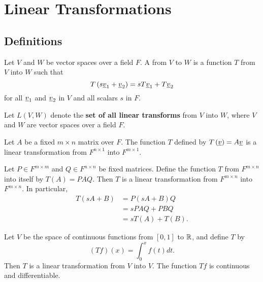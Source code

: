 \section{Linear Transformations}

\subsection{Definitions}

\begin{definition}
Let $V$ and $W$ be vector spaces over a field $F$.
A  from $V$ to $W$ is a function $T$ from $V$ into $W$ such that
\begin{equation*}
T \left( s \underline{v}_1 + \underline{v}_2 \right)
= s T \underline{v}_1 + T \underline{v}_2
\end{equation*}
for all $\underline{v}_1$ and $\underline{v}_2$ in $V$ and all scalars $s$ in $F$.
\end{definition}

\begin{definition}
Let $L(V,W)$ denote the \textbf{set of all linear transforms} from $V$ into $W$, where $V$ and $W$ are vector spaces over a field $F$.
\end{definition}

\begin{example}
Let $A$ be a fixed $m \times n$ matrix over $F$.
The function $T$ defined by $T \left( \underline{v} \right) = A \underline{v}$ is a linear transformation from $F^{n \times 1}$ into $F^{m \times 1}$.
\end{example}

\begin{example}
Let $P \in F^{m \times m}$ and $Q \in F^{n \times n}$ be fixed matrices.
Define the function $T$ from $F^{m \times n}$ into itself by $T(A) = P A Q$.
Then $T$ is a linear transformation from $F^{m \times n}$ into $F^{m \times n}$.
In particular,
\begin{equation*}
\begin{split}
T \left( s A + B \right)
&= P \left( s A + B \right) Q \\
&= s P A Q + P B Q \\
&= s T \left( A \right) + T \left( B \right) .
\end{split}
\end{equation*}
\end{example}

\begin{example}
Let $V$ be the space of continuous functions from $[0,1]$ to $\mathbb{R}$, and define $T$ by
\begin{equation*}
(Tf)(x) = \int_{0}^x f(t) dt .
\end{equation*}
Then $T$ is a linear transformation from $V$ into $V$.
The function $Tf$ is continuous and differentiable.
\end{example}

